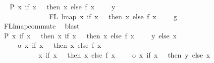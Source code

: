 \begin{isabellebody}
\ \isamarkupfalse%
\ P{}{\isacharcolon}{\kern0pt}\ {\isachardoublequoteopen}{\isacharparenleft}{\kern0pt}{\isasymlambda}x{\isachardot}{\kern0pt}\ if\ x\ {\isacharequal}{\kern0pt}\ {}\ then\ x\ else\ f\ {\isacharparenleft}{\kern0pt}x\ {\isacharminus}{\kern0pt}\ {}{\isacharparenright}{\kern0pt}\ {\isacharplus}{\kern0pt}\ {}{\isacharparenright}{\kern0pt}\ y\isanewline
\ \ \ \ \ \ \ \ \ \ \ \ \ {\isasymin}\ FL\ {\isacharparenleft}{\kern0pt}lmap\ {\isacharparenleft}{\kern0pt}{\isasymlambda}x{\isachardot}{\kern0pt}\ if\ x\ {\isacharequal}{\kern0pt}\ {}\ then\ x\ else\ f\ {\isacharparenleft}{\kern0pt}x\ {\isacharminus}{\kern0pt}\ {}{\isacharparenright}{\kern0pt}\ {\isacharplus}{\kern0pt}\ {}{\isacharparenright}{\kern0pt}\ g{\isacharparenright}{\kern0pt}{\isachardoublequoteclose}\isanewline
\ \ \ \ \isamarkupfalse%
\ FL{\isacharunderscore}{\kern0pt}lmap{\isacharunderscore}{\kern0pt}commute\ \isamarkupfalse%
\ blast\isanewline
\isanewline
\ \ \isamarkupfalse%
\ P{}{\isacharcolon}{\kern0pt}\ {\isachardoublequoteopen}{\isacharparenleft}{\kern0pt}{\isasymlambda}x{\isachardot}{\kern0pt}\ if\ x\ {\isacharequal}{\kern0pt}\ {}\ then\ {\isacharparenleft}{\kern0pt}{\isasymlambda}x{\isachardot}{\kern0pt}\ if\ x\ {\isacharequal}{\kern0pt}\ {}\ then\ x\ else\ f\ {\isacharparenleft}{\kern0pt}x\ {\isacharminus}{\kern0pt}\ {}{\isacharparenright}{\kern0pt}\ {\isacharplus}{\kern0pt}\ {}{\isacharparenright}{\kern0pt}\ y\ else\ x{\isacharparenright}{\kern0pt}\isanewline
\ \ \ \ \ o\ {\isacharparenleft}{\kern0pt}{\isasymlambda}x{\isachardot}{\kern0pt}\ if\ x\ {\isacharequal}{\kern0pt}\ {}\ then\ x\ else\ f\ {\isacharparenleft}{\kern0pt}x\ {\isacharminus}{\kern0pt}\ {}{\isacharparenright}{\kern0pt}\ {\isacharplus}{\kern0pt}\ {}{\isacharparenright}{\kern0pt}\ {\isacharequal}{\kern0pt}\isanewline
\ \ \ \ \ \ \ \ \ \ \ {\isacharparenleft}{\kern0pt}{\isasymlambda}x{\isachardot}{\kern0pt}\ if\ x\ {\isacharequal}{\kern0pt}\ {}\ then\ x\ else\ f\ {\isacharparenleft}{\kern0pt}x\ {\isacharminus}{\kern0pt}\ {}{\isacharparenright}{\kern0pt}\ {\isacharplus}{\kern0pt}\ {}{\isacharparenright}{\kern0pt}\ o\ {\isacharparenleft}{\kern0pt}{\isasymlambda}x{\isachardot}{\kern0pt}\ if\ x\ {\isacharequal}{\kern0pt}\ {}\ then\ y\ else\ x{\isacharparenright}{\kern0pt}{\isachardoublequoteclose}\isanewline
\ \ \ \ \isamarkupfalse%

\end{isabellebody}
